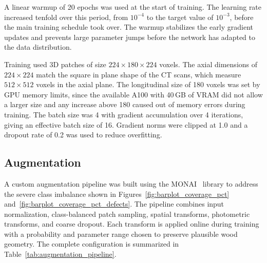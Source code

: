 A linear warmup of 20 epochs was used at the start of training. The learning rate increased tenfold over this period, from $10^{-4}$ to the target value of $10^{-3}$, before the main training schedule took over. The warmup stabilizes the early gradient updates and prevents large parameter jumps before the network has adapted to the data distribution.

Training used 3D patches of size $224 \times 180 \times 224$ voxels. The axial dimensions of $224 \times 224$ match the square in plane shape of the CT scans, which measure $512 \times 512$ voxels in the axial plane. The longitudinal size of 180 voxels was set by GPU memory limits, since the available A100 with 40\,GB of VRAM did not allow a larger size and any increase above 180 caused out of memory errors during training. The batch size was 4 with gradient accumulation over 4 iterations, giving an effective batch size of 16. Gradient norms were clipped at 1.0 and a dropout rate of 0.2 was used to reduce overfitting.

\subsection{Augmentation}
\label{sec:custom_augmentation}

A custom augmentation pipeline was built using the MONAI~\cite{cardoso2022monai} library to address the severe class imbalance shown in Figures~\ref{fig:barplot_coverage_pct} and~\ref{fig:barplot_coverage_pct_defects}. The pipeline combines input normalization, class-balanced patch sampling, spatial transforms, photometric transforms, and coarse dropout. Each transform is applied online during training with a probability and parameter range chosen to preserve plausible wood geometry. The complete configuration is summarized in Table~\ref{tab:augmentation_pipeline}.

